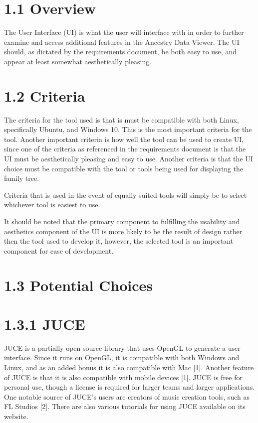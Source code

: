 \documentclass[onecolumn, draftclsnofoot,10pt, compsoc]{IEEEtran}
\begin{document}
\section{1.1 Overview}
The User Interface (UI) is what the user will interface with in order to further examine and access additional features in the Ancestry Data Viewer. The UI should, as dictated by the requirements document, be both easy to use, and appear at least somewhat aesthetically pleasing.

\section{1.2 Criteria}
The criteria for the tool used is that is must be compatible with both Linux, specifically Ubuntu, and Windows 10. This is the most important criteria for the tool. Another important criteria is how well the tool can be used to create UI, since one of the criteria as referenced in the requirements document is that the UI must be aesthetically pleasing and easy to use. Another criteria is that the UI choice must be compatible with the tool or tools being used for displaying the family tree.

Criteria that is used in the event of equally suited tools will simply be to select whichever tool is easiest to use. 

It should be noted that the primary component to fulfilling the usability and aesthetics component of the UI is more likely to be the result of design rather then the tool used to develop it, however, the selected tool is an important component for ease of development.

\section{1.3 Potential Choices}
\section{1.3.1 JUCE}
JUCE is a partially open-source library that uses OpenGL to generate a user interface. Since it runs on OpenGL, it is compatible with both Windows and Linux, and as an added bonus it is also compatible with Mac [1]. Another feature of JUCE is that it is also compatible with mobile devices [1]. JUCE is free for personal use, though a license is required for larger teams and larger applications. One notable source of JUCE’s users are creators of music creation tools, such as FL Studios [2]. There are also various tutorials for using JUCE available on its website.
\end{document}
